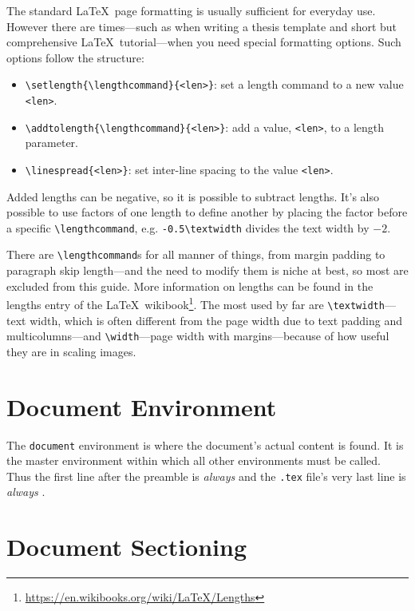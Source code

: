 The standard \LaTeX~page formatting is usually sufficient for everyday
use.  However there are times---such as when writing a thesis template
and short but comprehensive \LaTeX~tutorial---when you need special
formatting options.  Such options follow the structure:
\begin{itemize}
    \item \verb|\setlength{\lengthcommand}{<len>}|: set a length command to a new value \verb|<len>|.
    \item \verb|\addtolength{\lengthcommand}{<len>}|: add a value, \verb|<len>|, to a length parameter.
    \item \verb|\linespread{<len>}|: set inter-line spacing to the value \verb|<len>|.
\end{itemize}
Added lengths can be negative, so it is possible to subtract lengths.
It's also possible to use factors of one length to define another by
placing the factor before a specific \verb|\lengthcommand|,
e.g. \verb|-0.5\textwidth| divides the text width by $-2$.

There are \verb|\lengthcommand|s for all manner of things, from margin
padding to paragraph skip length---and the need to modify them is
niche at best, so most are excluded from this guide.  More information
on lengths can be found in the lengths entry of the
\LaTeX~wikibook\footnote{\url{https://en.wikibooks.org/wiki/LaTeX/Lengths}}.
The most used by far are \verb|\textwidth|---text width, which is
often different from the page width due to text padding and
multicolumns---and \verb|\width|---page width with margins---because
of how useful they are in scaling images.

%
\section{Document Environment}
%
%

The \verb|document| environment is where the document's actual content
is found.  It is the master environment within which all other
environments must be called.  Thus the first line after the preamble
is \emph{always} \verb|| and the \texttt{.tex} file's
very last line is \emph{always} \verb||.

\section{Document Sectioning}
%

